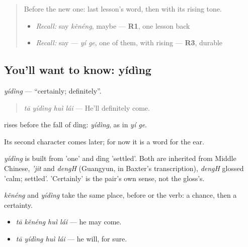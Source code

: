 \label{lesson:ZH-C147-yiding}



\begin{quote}
Before the new one: last lesson's word, then  with its rising tone.

\begin{itemize}
\raggedright
  \item \emph{Recall:} say \emph{kěnéng}, maybe — \textbf{R1}, one lesson back
  \item \emph{Recall:} say  — \emph{yí ge}, one of them, with  rising — \textbf{R3}, durable
\end{itemize}
\end{quote}

\subsection*{You'll want to know: yídìng}
\emph{yídìng} — \textquotedblleft{}certainly; definitely\textquotedblright{}.

\begin{quote}
\emph{tā yídìng huì lái} — He'll definitely come.
\end{quote}

 rises before the fall of dìng: \emph{yídìng}, as in \emph{yí ge}.

Its second character comes later; for now it is a word for the ear.

\begin{cousinweb}
\emph{yídìng} is built from  'one' and dìng 'settled'. Both are inherited from Middle Chinese, \emph{'jit} and \emph{dengH} (Guangyun, in Baxter's transcription), \emph{dengH} glossed 'calm; settled'. 'Certainly' is the pair's own sense, not the gloss's.
\end{cousinweb}

\begin{grammarlens}[title={What you've built}]
\emph{kěnéng} and \emph{yídìng} take the same place, before  or the verb: a chance, then a certainty.

\begin{itemize}
\raggedright
  \item \emph{tā kěnéng huì lái} — he may come.
  \item \emph{tā yídìng huì lái} — he will, for sure.
\end{itemize}
\end{grammarlens}

